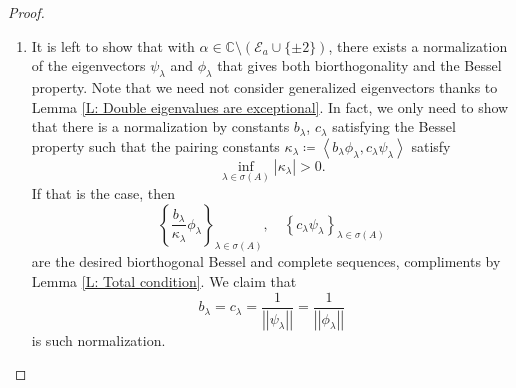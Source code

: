 \documentclass[11pt, a4paper,reqno]{amsart}
\theoremstyle{plain}
\theoremstyle{definition}
\theoremstyle{remark}
\newcommand{\inner}[2]{\left\langle{#1}, {#2}\right\rangle}
\newcommand{\norm}[1]{\left|\left|#1\right|\right|}
\newcommand{\1}{\mathds 1}
\begin{document}
\begin{proof}
\begin{enumerate}
        \item It is left to show that with $\alpha \in \mathbb C \setminus (\mathcal E_a \cup \{\pm 2\})$, there exists a normalization of the eigenvectors $\psi_\lambda$ and $\phi_\lambda$ that gives both biorthogonality and the Bessel property. Note that we need not consider generalized eigenvectors thanks to Lemma \ref{L: Double eigenvalues are exceptional}. In fact, we only need to show that there is a normalization by constants $b_\lambda$, $c_\lambda$ satisfying the Bessel property such that the pairing constants $\kappa_\lambda \coloneqq \inner{b_\lambda\phi_\lambda}{c_\lambda\psi_\lambda}$ satisfy
        \[
        \inf_{\lambda\in\sigma(A)}|\kappa_\lambda| > 0.
        \]
        If that is the case, then
        \[
        \left\{\frac{b_\lambda}{\kappa_\lambda}\phi_\lambda\right\}_{\lambda \in \sigma(A)}, \quad \left\{c_\lambda\psi_\lambda\right\}_{\lambda\in\sigma(A)}
        \]
        are the desired biorthogonal Bessel and complete sequences, compliments by Lemma \ref{L: Total condition}. We claim that
        \[
        b_\lambda = c_\lambda = \frac{1}{\norm{\psi_\lambda}} = \frac{1}{\norm{\phi_\lambda}}
        \]
        is such normalization.


\end{enumerate}
\end{proof}
\end{document}

